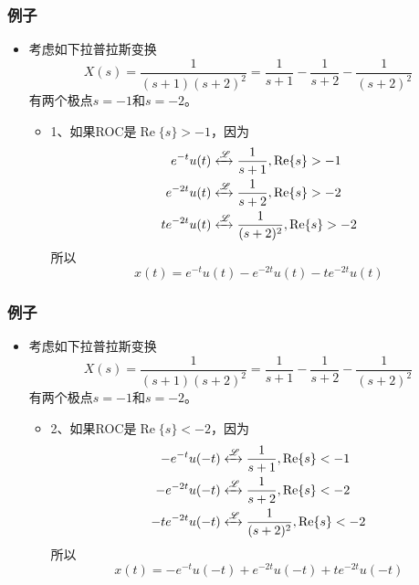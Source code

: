 \documentclass[CJKutf8,dvipsnames,table]{beamer}
\begin{document}
\begin{CJK*}{UTF8}{song}
  \begin{frame}
    \frametitle{例子}
    \begin{itemize}
    \item 考虑如下拉普拉斯变换
	\[
	   	X(s)  = \frac{1}{(s+1)(s+2)^2} = \frac{1}{s+1} - \frac{1}{s+2} - \frac{1}{(s+2)^2}
	\]
	有两个极点$s=-1$和$s=-2$。
		\begin{itemize}
		\item 1、如果ROC是$\operatorname{Re}\{s\} > -1$，因为
		\begin{align*}
			e^{-t}u(t) & \xleftrightarrow{\mathscr{L}} \frac{1}{s+1}, \operatorname{Re}\{s\} > -1 \\
			e^{-2t}u(t) & \xleftrightarrow{\mathscr{L}} \frac{1}{s+2}, \operatorname{Re}\{s\} > -2 \\
			te^{-2t}u(t) & \xleftrightarrow{\mathscr{L}} \frac{1}{(s+2)^2}, \operatorname{Re}\{s\} > -2 
		\end{align*}
		所以
		\[
			x(t) = e^{-t}u(t) - e^{-2t}u(t) - te^{-2t}u(t)
		\]
		\end{itemize}
    \end{itemize}
  \end{frame}  
      
  \begin{frame}
    \frametitle{例子}
    \begin{itemize}
    \item 考虑如下拉普拉斯变换
	\[
	   	X(s)  = \frac{1}{(s+1)(s+2)^2} = \frac{1}{s+1} - \frac{1}{s+2} - \frac{1}{(s+2)^2}
	\]
	有两个极点$s=-1$和$s=-2$。
		\begin{itemize}
		\item 2、如果ROC是$\operatorname{Re}\{s\} < -2$，因为
		\begin{align*}
			-e^{-t}u(-t) & \xleftrightarrow{\mathscr{L}} \frac{1}{s+1}, \operatorname{Re}\{s\} < -1 \\
			-e^{-2t}u(-t) & \xleftrightarrow{\mathscr{L}} \frac{1}{s+2}, \operatorname{Re}\{s\} < -2 \\
			-te^{-2t}u(-t) & \xleftrightarrow{\mathscr{L}} \frac{1}{(s+2)^2}, \operatorname{Re}\{s\} < -2 
		\end{align*}
		所以
		\[
			x(t) = -e^{-t}u(-t) + e^{-2t}u(-t) + te^{-2t}u(-t)
		\]
		\end{itemize}
    \end{itemize}
  \end{frame}  
        

\end{CJK*}
\end{document}
